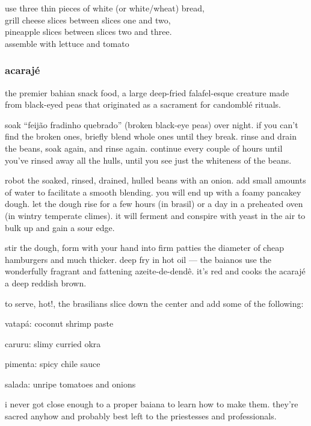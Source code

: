 use three thin pieces of white (or white/wheat) bread,\\
grill cheese slices between slices one and two,\\
pineapple slices between slices two and three.\\
assemble with lettuce and tomato\\

\subsubsection{acaraj\'{e}}

the premier bahian snack food, a large deep-fried falafel-esque
creature made from black-eyed peas that originated as a sacrament for
candombl\'{e} rituals.

soak ``feij\~{a}o fradinho quebrado'' (broken black-eye peas) over
night. if you can't find the broken ones, briefly blend whole ones
until they break.  rinse and drain the beans, soak again, and rinse
again. continue every couple of hours until you've rinsed away all the
hulls, until you see just the whiteness of the beans.

robot the soaked, rinsed, drained, hulled beans with an onion. add
small amounts of water to facilitate a smooth blending. you will end
up with a foamy pancakey dough. let the dough rise for a few hours (in
brasil) or a day in a preheated oven (in wintry temperate climes). it
will ferment and conspire with yeast in the air to bulk up and gain a
sour edge.

stir the dough, form with your hand into firm patties the diameter of
cheap hamburgers and much thicker. deep fry in hot oil --- the baianos
use the wonderfully fragrant and fattening azeite-de-dend\^{e}. it's
red and cooks the acaraj\'{e} a deep reddish brown.

to serve, hot!, the brasilians slice down the center and add some of the following:

\begin{ingredients}
  \item vatap\'{a}: coconut shrimp paste
  \item caruru: slimy curried okra
  \item pimenta: spicy chile sauce
  \item salada: unripe tomatoes and onions
\end{ingredients}

i never got close enough to a proper baiana to learn how to make
them. they're sacred anyhow and probably best left to the priestesses
and professionals.

